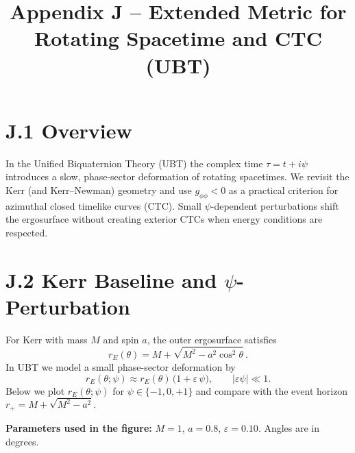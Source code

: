 \documentclass[12pt]{article}
\title{Appendix J – Extended Metric for Rotating Spacetime and CTC (UBT)}
\date{}
\begin{document}
\maketitle

\section*{J.1 Overview}
In the Unified Biquaternion Theory (UBT) the complex time $\tau=t+i\psi$ introduces a slow, phase-sector deformation of rotating spacetimes. 
We revisit the Kerr (and Kerr--Newman) geometry and use $g_{\phi\phi}<0$ as a practical criterion for azimuthal closed timelike curves (CTC).
Small $\psi$-dependent perturbations shift the ergosurface without creating exterior CTCs when energy conditions are respected.

\section*{J.2 Kerr Baseline and $\psi$-Perturbation}
For Kerr with mass $M$ and spin $a$, the outer ergosurface satisfies
\begin{equation}
r_E(\theta)=M+\sqrt{M^2-a^2\cos^2\theta}\,.
\end{equation}
In UBT we model a small phase-sector deformation by
\begin{equation}
r_E(\theta;\psi)\approx r_E(\theta)\,\bigl(1+\varepsilon\,\psi\bigr),\qquad |\varepsilon\psi|\ll 1.
\end{equation}
Below we plot $r_E(\theta;\psi)$ for $\psi\in\{-1,0,+1\}$ and compare with the event horizon $r_+=M+\sqrt{M^2-a^2}$.

\bigskip
\noindent\textbf{Parameters used in the figure:} $M=1$, $a=0.8$, $\varepsilon=0.10$. Angles are in degrees.
\end{document}
